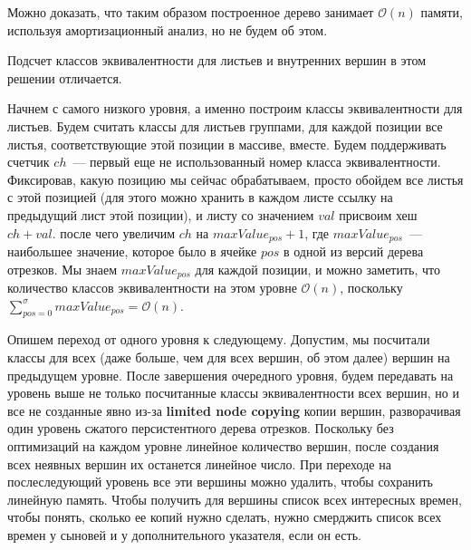 Можно доказать, что таким образом построенное дерево занимает $\mathcal{O}(n)$ памяти, используя амортизационный анализ, но не будем об этом. 

Подсчет классов эквивалентности для листьев и внутренних вершин в этом решении отличается.

Начнем с самого низкого уровня, а именно построим классы эквивалентности для листьев. Будем считать классы для листьев группами, для каждой позиции все листья, соответствующие этой позиции в массиве, вместе. Будем поддерживать счетчик $ch$~--- первый еще не использованный номер класса эквивалентности. Фиксировав, какую позицию мы сейчас обрабатываем, просто обойдем все листья с этой позицией (для этого можно хранить в каждом листе ссылку на предыдущий лист этой позиции), и листу со значением $val$ присвоим хеш $ch+val$. после чего увеличим $ch$ на $maxValue_{pos}+1$, где $maxValue_{pos}$~--- наибольшее значение, которое было в ячейке $pos$ в одной из версий дерева отрезков. Мы знаем $maxValue_{pos}$ для каждой позиции, и можно заметить, что количество классов эквивалентности на этом уровне $\mathcal{O}(n)$, поскольку $\sum \limits_{pos=0}^{\sigma} maxValue_{pos} = \mathcal{O}(n)$.

Опишем переход от одного уровня к следующему. Допустим, мы посчитали классы для всех (даже больше, чем для всех вершин, об этом далее) вершин на предыдущем уровне. После завершения очередного уровня, будем передавать на уровень выше не только посчитанные классы эквивалентности всех вершин, но и все не созданные явно из-за \textbf{limited node copying} копии вершин, разворачивая один уровень сжатого персистентного дерева отрезков. Поскольку без оптимизаций на каждом уровне линейное количество вершин, после создания всех неявных вершин их останется линейное число. При переходе на послеследующий уровень все эти вершины можно удалить, чтобы сохранить линейную память.
Чтобы получить для вершины список всех интересных времен, чтобы понять, сколько ее копий нужно сделать, нужно смерджить список всех времен у сыновей и у дополнительного указателя, если он есть.

